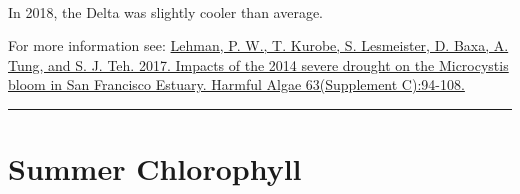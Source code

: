 \documentclass[
]{book}
\begin{document}
\begin{panel-grid}
\begin{columns-nocenter}
\begin{column800}
\end{column800}

\begin{column40}

~

\end{column40}

\begin{column800}

In 2018, the Delta was slightly cooler than average.

\end{column800}

\end{columns-nocenter}

\end{panel-grid}

\begin{disclaimer}
For more information see:
\href{https://www.sciencedirect.com/science/article/pii/S1568988316302177}{Lehman,
P. W., T. Kurobe, S. Lesmeister, D. Baxa, A. Tung, and S. J. Teh. 2017.
Impacts of the 2014 severe drought on the Microcystis bloom in San
Francisco Estuary. Harmful Algae 63(Supplement C):94-108.}
\end{disclaimer}

\begin{center}\rule{0.5\linewidth}{0.5pt}\end{center}

\hypertarget{summer-chlorophyll}{%
\section{Summer Chlorophyll}\label{summer-chlorophyll}}
\end{document}
